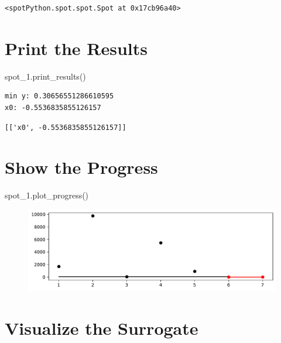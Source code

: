 \documentclass[
  letterpaper,
  DIV=11,
  numbers=noendperiod]{scrreprt}
\newenvironment{Shaded}{\begin{snugshade}}{\end{snugshade}}
\newcommand{\NormalTok}[1]{\textcolor[rgb]{0.00,0.23,0.31}{#1}}
\begin{document}
\begin{verbatim}
<spotPython.spot.spot.Spot at 0x17cb96a40>
\end{verbatim}

\hypertarget{print-the-results-5}{%
\section{Print the Results}\label{print-the-results-5}}

\begin{Shaded}
\begin{Highlighting}[]
\NormalTok{spot\_1.print\_results()}
\end{Highlighting}
\end{Shaded}

\begin{verbatim}
min y: 0.30656551286610595
x0: -0.5536835855126157
\end{verbatim}

\begin{verbatim}
[['x0', -0.5536835855126157]]
\end{verbatim}

\hypertarget{show-the-progress-2}{%
\section{Show the Progress}\label{show-the-progress-2}}

\begin{Shaded}
\begin{Highlighting}[]
\NormalTok{spot\_1.plot\_progress()}
\end{Highlighting}
\end{Shaded}

\begin{figure}[H]

{\centering \includegraphics{99_spot_doc_files/figure-pdf/cell-8-output-1.pdf}

}

\end{figure}

\hypertarget{visualize-the-surrogate}{%
\section{Visualize the Surrogate}\label{visualize-the-surrogate}}
\end{document}
